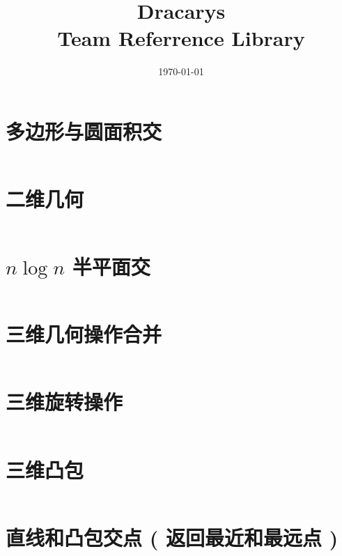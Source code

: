 \documentclass[titlepage,landscape,a4paper,10pt]{article}
\title{\LARGE{Dracarys} \\[2ex] \Large{Team Referrence Library} }
\date{\today}
\begin{document}
\maketitle

\begin{multicols*}{2}

\begin{spacing}{0}
	\tableofcontents
\end{spacing}
\end{multicols*}

\begin{multicols}{2}

\newpage


\begin{spacing}{0.8}

\section{多边形与圆面积交}
\inputminted{cpp}{src/多边形与圆面积交.cpp}

\section{二维几何}
\inputminted{cpp}{src/二维几何.cpp}

\section{$n\log n$ 半平面交}
\inputminted{cpp}{src/nlogn半平面交.cpp}

\section{三维几何操作合并}
\inputminted{cpp}{src/三维几何操作合并.cpp}

\section{三维旋转操作}
\inputminted{cpp}{src/三维旋转操作.cpp}

\section{三维凸包}
\inputminted{cpp}{src/三维凸包.cpp}

\section{直线和凸包交点 ( 返回最近和最远点 )}
\inputminted{cpp}{src/直线和凸包交点(返回最近和最远点).cpp}


\end{spacing}
\end{multicols}
\end{document}
